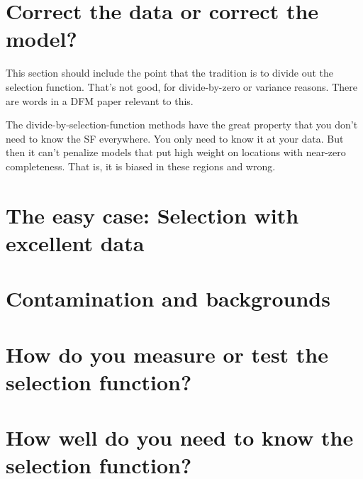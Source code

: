 \documentclass[modern]{aastex62}
\begin{document}

\section{Correct the data or correct the model?}\label{sec:correct}

This section should include the point that the tradition is to divide out
the selection function. That's not good, for divide-by-zero or variance
reasons. There are words in a DFM paper relevant to this.

The divide-by-selection-function methods have the great property that you don't need
to know the SF everywhere. You only need to know it at your data. But then
it can't penalize models that put high weight on locations with near-zero
completeness. That is, it is biased in these regions and wrong.

\section{The easy case: Selection with excellent data}\label{sec:easy}

\section{Contamination and backgrounds}\label{sec:bg}

\section{How do you measure or test the selection function?}\label{sec:estimate}

\section{How well do you need to know the selection function?}\label{sec:quality}
\end{document}
